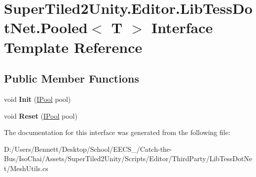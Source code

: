 \hypertarget{interface_super_tiled2_unity_1_1_editor_1_1_lib_tess_dot_net_1_1_pooled}{}\section{Super\+Tiled2\+Unity.\+Editor.\+Lib\+Tess\+Dot\+Net.\+Pooled$<$ T $>$ Interface Template Reference}
\label{interface_super_tiled2_unity_1_1_editor_1_1_lib_tess_dot_net_1_1_pooled}
\subsection*{Public Member Functions}
\begin{DoxyCompactItemize}
\item 
\mbox{\label{interface_super_tiled2_unity_1_1_editor_1_1_lib_tess_dot_net_1_1_pooled_a6e242feb035a7305c3aa8b1433924ab8}} 
void {\bfseries Init} (\mbox{\hyperlink{class_super_tiled2_unity_1_1_editor_1_1_lib_tess_dot_net_1_1_i_pool}{I\+Pool}} pool)
\item 
\mbox{\label{interface_super_tiled2_unity_1_1_editor_1_1_lib_tess_dot_net_1_1_pooled_a87a7b12820cd83d005b003a2cefb4df6}} 
void {\bfseries Reset} (\mbox{\hyperlink{class_super_tiled2_unity_1_1_editor_1_1_lib_tess_dot_net_1_1_i_pool}{I\+Pool}} pool)
\end{DoxyCompactItemize}


The documentation for this interface was generated from the following file\+:\begin{DoxyCompactItemize}
\item 
D\+:/\+Users/\+Bennett/\+Desktop/\+School/\+E\+E\+C\+S\+\_/\+Catch-\/the-\/\+Bus/\+Iso\+Chai/\+Assets/\+Super\+Tiled2\+Unity/\+Scripts/\+Editor/\+Third\+Party/\+Lib\+Tess\+Dot\+Net/Mesh\+Utils.\+cs\end{DoxyCompactItemize}
